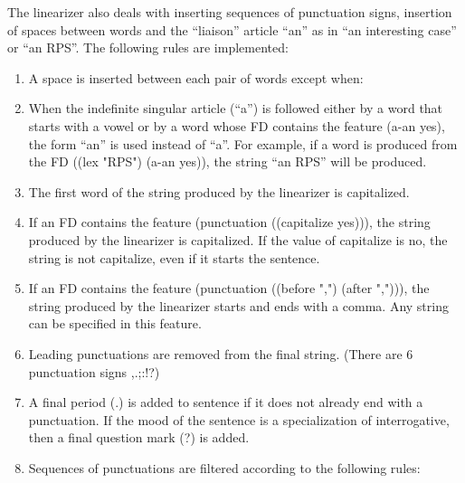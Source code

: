 \documentclass[10pt,a4paper]{report}
\begin{document}
The linearizer also deals with inserting sequences of punctuation signs,
insertion of spaces between words and the ``liaison'' article ``an'' as in
``an interesting case'' or ``an RPS''.  The following rules are
implemented: 
\begin{enumerate}
\item A space is inserted between each pair of words except when:

\item When the indefinite singular article (``a'') is followed either by a word that
starts with a vowel or by a word whose FD contains the feature (a-an yes),
the form ``an'' is used instead of ``a''.  For example, if a word is
produced from the FD ((lex "RPS") (a-an yes)), the string ``an RPS'' will
be produced.

\item The first word of the string produced by the linearizer is capitalized.

\item If an FD contains the feature (punctuation ((capitalize yes))), the string
produced by the linearizer is capitalized.  If the value of capitalize is
no, the string is not capitalize, even if it starts the sentence.

\item If an FD contains the feature (punctuation ((before ",") (after ","))), the
string produced by the linearizer starts and ends with a comma.  Any string
can be specified in this feature.

\item Leading punctuations are removed from the final string. (There are 6
punctuation signs ,.;:!?)

\item A final period (.) is added to sentence if it does not already end with a
punctuation.  If the mood of the sentence is a specialization of
interrogative, then a final question mark (?) is added.

\item Sequences of punctuations are filtered according to the following rules:


\end{enumerate}
\end{document}

